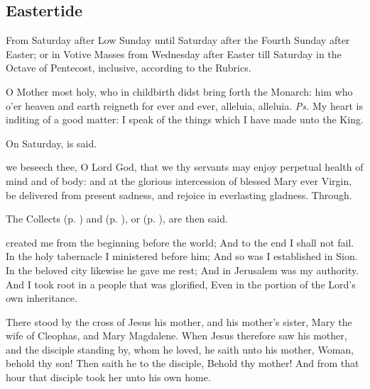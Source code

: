 \clearpage
\subsection{Eastertide}
\begin{rubric}
    {From Saturday after Low Sunday until Saturday after the Fourth Sunday after Easter; or in Votive Masses from Wednesday after Easter till Saturday in the Octave of Pentecost, inclusive, according to the Rubrics.}
\end{rubric}

\introit
{} O Mother most holy, who in childbirth didst bring forth the Monarch: him who o'er heaven and earth reigneth for ever and ever, alleluia, alleluia. \textit{Ps.} My heart is inditing of a good matter: I speak of the things which I have made unto the King.
\begin{rubric}
    On Saturday,  is said.
\end{rubric}

\collect
{} we beseech thee, O Lord God, that we thy servants may enjoy perpetual health of mind and of body: and at the glorious intercession of blessed Mary ever Virgin, be delivered from present sadness, and rejoice in everlasting gladness. Through.
\begin{rubric}
    The Collects  (p. \pageref{SPHolyGhost}) and  (p. \pageref{SPAgainst}), or  (p. \pageref{SPChiefBishop}), are then said.
\end{rubric}

 created me from the beginning before the world; And to the end I shall not fail. In the holy tabernacle I ministered before him; And so was I established in Sion. In the beloved city likewise he gave me rest; And in Jerusalem was my authority. And I took root in a people that was glorified, Even in the portion of the Lord’s own inheritance.


 There stood by the cross of Jesus his mother, and his mother's sister, Mary the wife of Cleophas, and Mary Magdalene. When Jesus therefore saw his mother, and the disciple standing by, whom he loved, he saith unto his mother, Woman, behold thy son! Then saith he to the disciple, Behold thy mother! And from that hour that disciple took her unto his own home.

